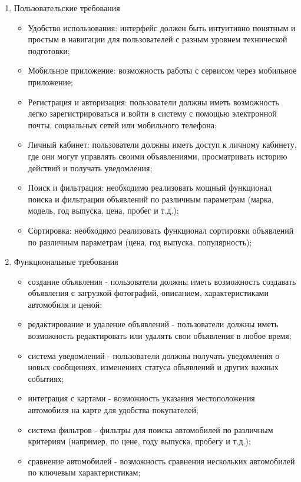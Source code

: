 \begin{enumerate}
    \item Пользовательские требования
        \begin{itemize}
            \item Удобство использования: интерфейс должен быть интуитивно понятным и простым в навигации для пользователей с разным уровнем технической подготовки;
            \item Мобильное приложение: возможность работы с сервисом через мобильное приложение;
            \item Регистрация и авторизация: пользователи должны иметь возможность легко зарегистрироваться и войти в систему с помощью электронной почты, социальных сетей или мобильного телефона;
            \item Личный кабинет: пользователи должны иметь доступ к личному кабинету, где они могут управлять своими объявлениями, просматривать историю действий и получать уведомления;
            \item Поиск и фильтрация: необходимо реализовать мощный функционал поиска и фильтрации объявлений по различным параметрам (марка, модель, год выпуска, цена, пробег и т.д.);
            \item Сортировка: необходимо реализовать функционал сортировки объявлений по различным параметрам (цена, год выпуска, популярность);
        \end{itemize}
    \item Функциональные требования
        \begin{itemize}
            \item создание объявления - пользователи должны иметь возможность создавать объявления с загрузкой фотографий, описанием, характеристиками автомобиля и ценой;
            \item редактирование и удаление объявлений - пользователи должны иметь возможность редактировать или удалять свои объявления в любое время;
            \item система уведомлений - пользователи должны получать уведомления о новых сообщениях, изменениях статуса объявлений и других важных событиях;
            \item интеграция с картами - возможность указания местоположения автомобиля на карте для удобства покупателей;
            \item система фильтров - фильтры для поиска автомобилей по различным критериям (например, по цене, году выпуска, пробегу и т.д.);
            \item сравнение автомобилей - возможность сравнения нескольких автомобилей по ключевым характеристикам;

\end{itemize}
\end{enumerate}
